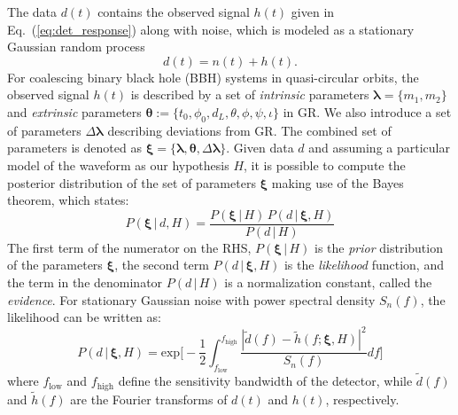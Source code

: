 \documentclass[prl,preprintnumbers,twocolumn,eqsecnum,floatfix,a4paper,nofootinbib,superscriptaddress]{revtex4}
\newcommand{\blambda}{\bm{\lambda}}
\newcommand{\btheta}{\bm{\theta}}
\newcommand{\bxi}{\bm{\xi}}
\begin{document}
The data $d(t)$ contains the observed signal $h(t)$ given in Eq.~(\ref{eq:det_response}) along with noise, which is modeled as a stationary Gaussian random process 
\begin{equation}
d(t) = n(t) + h(t). 
\label{eq:detector_strain}
\end{equation}
For coalescing binary black hole (BBH) systems in quasi-circular orbits, the observed signal $h(t)$ is described by a set of \emph{intrinsic} parameters $\blambda = \{m_1, m_2\}$ and \emph{extrinsic} parameters  $\btheta := \{t_0, \phi_0, d_L, \theta, \phi, \psi, \iota\}$ in GR. We also introduce a set of parameters $\Delta \blambda$ describing deviations from GR. The combined set of parameters is denoted as $\bxi = \{\blambda, \btheta, \Delta \blambda\}$.  Given data $d$ and assuming a particular model of the waveform as our hypothesis $H$, it is possible to compute the posterior distribution of the set of parameters ${\bxi}$ making use of the Bayes theorem, which states: 
\begin{equation}
P({\bxi} \, | \, d, H) = \frac{P({\bxi} \, | \, H) \, P (d \, | \, {\bxi}, H)}{P(d \, | \, H)}
\label{eq:Bayes_theorem}
\end{equation} 
The first term of the numerator on the RHS, $P({\bxi} \, | \, H)$ is the \emph{prior} distribution of the parameters ${\bxi}$, the second term $P (d \, | \, {\bxi}, H)$ is the \emph{likelihood} function, and the term in the denominator $P(d \, | \, H)$ is a normalization constant, called the \emph{evidence}. For stationary Gaussian noise with power spectral density $S_n(f)$, the likelihood can be written as:
\begin{equation}
P (d \, | \, {\bxi}, H) = \text{exp}\Big[ -\frac{1}{2}\int_{f_\mathrm{low}}^{f_\mathrm{high}} \frac{|\tilde{d}(f) - \tilde{h}(f;{\bxi}, H)|^2}{S_n(f)}df\Big]
\end{equation}
where $f_\mathrm{low}$ and $f_\mathrm{high}$ define the sensitivity bandwidth of the detector, while $\tilde{d}(f)$ and $\tilde{h}(f)$ are the Fourier transforms of $d(t)$ and $h(t)$, respectively. 
\end{document}
